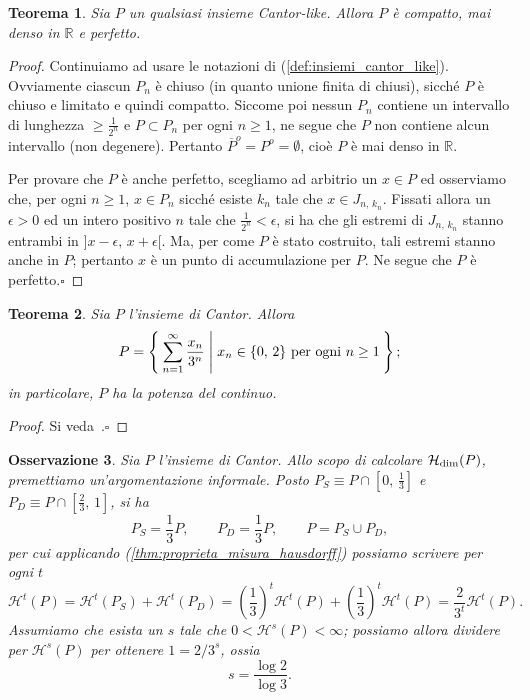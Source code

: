 \documentclass[a4paper,10pt,openright,oneside]{book}
\theoremstyle{theoremstyle}
\newtheorem{teorema}{Teorema}[section]
\theoremstyle{theoremstylewoheader}
\theoremstyle{theoremstyle}
\newtheorem{osservazione}[teorema]{Osservazione}
\theoremstyle{proofsecstyle}
\theoremstyle{nonumberplain}
\newtheorem{proof}{Dim.}
\newcommand{\RR}{\ensuremath{\mathbb{R}}}
\newcommand{\Haus}{\ensuremath{\mathcal{H}}}
\newcommand{\Hausdim}{\ensuremath{\Haus_\textup{dim}}}
\newcommand{\closure}[1]{\ensuremath{\overline{#1}}}
\newcommand{\interior}[1]{\ensuremath{#1^o}}
\renewcommand{\qedsymbol}{\ensuremath{\square}}
\newcommand{\qed}{\unskip\nobreak\hfill\nobreak\hspace{.5em}\qedsymbol}
\begin{document}
\begin{teorema}
\label{thm:proprieta_topologiche_insieme_cantor}
Sia $P$ un qualsiasi insieme Cantor-like. Allora $P$ è compatto, mai denso in $\RR$ e perfetto.
\end{teorema}

\begin{proof}
Continuiamo ad usare le notazioni di (\ref{def:insiemi_cantor_like}). Ovviamente ciascun $P_n$ è chiuso (in quanto unione finita di chiusi), sicché $P$ è chiuso e limitato e quindi compatto. Siccome poi nessun $P_n$ contiene un intervallo di lunghezza $\ge \frac{1}{2^n}$ e $P \subset P_n$ per ogni $n \ge 1$, ne segue che $P$ non contiene alcun intervallo (non degenere). Pertanto $\interior{\closure{P}} = \interior{P} = \emptyset$, cioè $P$ è mai denso in $\RR$.

Per provare che $P$ è anche perfetto, scegliamo ad arbitrio un $x \in P$ ed osserviamo che, per ogni $n \ge 1$, $x \in P_n$ sicché esiste $k_n$ tale che $x \in J_{n,\, k_n}$. Fissati allora un $\epsilon > 0$ ed un intero positivo $n$ tale che $\frac{1}{2^n} < \epsilon$, si ha che gli estremi di $J_{n,\, k_n}$ stanno entrambi in $]x - \epsilon,\, x + \epsilon[$. Ma, per come $P$ è stato costruito, tali estremi stanno anche in $P$; pertanto $x$ è un punto di accumulazione per $P$. Ne segue che $P$ è perfetto.\qed
\end{proof}

\begin{teorema}
Sia $P$ l'insieme di Cantor. Allora
\[
P = \Set{ \sum_{n=1}^\infty \frac{x_n}{3^n} | x_n \in \{0,\, 2\} \text{ per ogni $n \ge 1$} };
\]
in particolare, $P$ ha la potenza del continuo.
\end{teorema}

\begin{proof}
Si veda~\cite[Theorem~6.64, pag.~71]{stromberg}.\qed
\end{proof}

\begin{osservazione}
Sia $P$ l'insieme di Cantor. Allo scopo di calcolare $\Hausdim(P)$, premettiamo un'argomentazione informale. Posto $P_S \equiv P \cap \left[0,\, \frac{1}{3}\right]$ e $P_D \equiv P \cap \left[\frac{2}{3},\, 1\right]$, si ha
\[
P_S = \frac{1}{3}P,\qquad P_D = \frac{1}{3}P,\qquad P = P_S \cup P_D,
\]
per cui applicando (\ref{thm:proprieta_misura_hausdorff}) possiamo scrivere per ogni $t$
\[
\Haus^t(P) = \Haus^t(P_S) + \Haus^t(P_D) = \left(\frac{1}{3}\right)^t\Haus^t(P) + \left(\frac{1}{3}\right)^t\Haus^t(P) = \frac{2}{3^t}\Haus^t(P). 
\]
\emph{Assumiamo che esista un $s$ tale che $0 < \Haus^s(P) < \infty$}; possiamo allora dividere per $\Haus^s(P)$ per ottenere $1 = 2/3^s$, ossia
\[
s = \frac{\log 2}{\log 3}.
\]
\end{osservazione}
\end{document}
